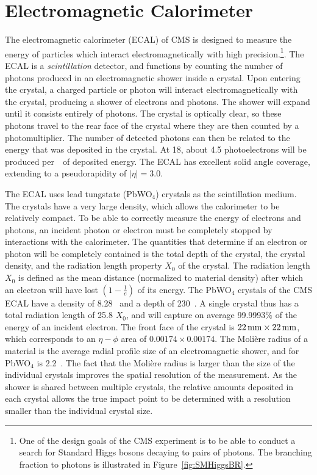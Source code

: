 \section{Electromagnetic Calorimeter}
The electromagnetic calorimeter (ECAL) of CMS is designed to measure the energy
of particles which interact electromagnetically with high
precision.\footnote{One of the design goals of the CMS experiment is to be able
to conduct a search for Standard Higgs bosons decaying to pairs of photons. The
branching fraction to photons is illustrated in Figure~\ref{fig:SMHiggsBR}.}.
The ECAL is a \emph{scintillation} detector, and functions by counting the
number of photons produced in an electromagnetic shower inside a crystal.  Upon
entering the crystal, a charged particle or photon will interact
electromagnetically with the crystal, producing a shower of electrons and
photons. The shower will expand until it consists entirely of photons.  The
crystal is optically clear, so these photons travel to the rear face of the
crystal where they are then counted by a photomultiplier.  The number of
detected photons can then be related to the energy that was deposited in the
crystal.  At 18\celsius, about 4.5 photoelectrons will be produced
per~\mega\electronvolt~of deposited energy.  The ECAL has excellent solid angle
coverage, extending to a pseudorapidity of $|\eta| = 3.0$.

The ECAL uses lead tungstate (PbWO$_4$) crystals as the scintillation medium.
The crystals have a very large density, which allows the calorimeter to be
relatively compact.  To be able to correctly measure the energy of electrons and
photons, an incident photon or electron must be completely stopped by
interactions with the calorimeter.  The quantities that determine if an electron
or photon will be completely contained is the total depth of the crystal, the
crystal density, and the radiation length property $X_0$ of the crystal.  The
radiation length $X_0$ is defined as the mean distance (normalized to material
density) after which an electron will have lost $(1-\frac{1}{e})$ of its energy.
The PbWO$_4$ crystals of the CMS ECAL have a density of
8.28~\gram\per\square{\centi\meter} and a depth of 230~\mm.  A single crystal
thus has a total radiation length of 25.8 $X_0$, and will capture on average
99.9993\% of the energy of an incident electron.  The front face of the crystal
is $22\,\text{mm} \times 22\,\text{mm}$, which corresponds to an $\eta-\phi$ area of $0.00174
\times 0.00174$.  The Moli\`{e}re radius of a material is the average radial
profile size of an electromagnetic shower, and for PbWO$_4$ is 2.2~\centi\meter.
The fact that the Moli\`{e}re radius is larger than the size of the individual
crystals improves the spatial resolution of the measurement.  As the shower is
shared between multiple crystals, the relative amounts deposited in each crystal
allows the true impact point to be determined with a resolution smaller than the
individual crystal size.

